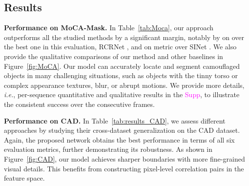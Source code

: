 \documentclass[10pt,twocolumn,letterpaper]{article}
\def\ie{\emph{i.e.}}
\newcommand{\supp}[1]{\textcolor{magenta}{#1}}
\def\figref#1{Figure~\ref{#1}}
\def\tabref#1{Table~\ref{#1}}
\begin{document}
\subsection{Results}
\textbf{Performance on MoCA-Mask.} 
In \tabref{tab:Moca}, our approach outperforms all the studied methods by a significant margin, notably by  on  over the best one in this evaluation, RCRNet \cite{yan2019semi}, and  on  metric over SINet \cite{fan2020Camouflage}. 
We also provide the qualitative comparisons of our method and other baselines in \figref{fig:MoCA}. Our model can accurately locate and segment camouflaged objects in many challenging situations, such as objects with the tinny torso or complex appearance textures, blur, or abrupt motions. We provide more details, \ie, per-sequence quantitative and qualitative results in the \supp{Supp}, to illustrate the consistent success over the consecutive frames.  


\textbf{Performance on CAD.} In \tabref{tab:results_CAD}, we assess different approaches by studying their cross-dataset generalization on the CAD dataset. Again, the proposed network obtains the best performance in terms of all six evaluation metrics, further demonstrating its robustness. As shown in \figref{fig:CAD}, our model achieves sharper boundaries with more fine-grained visual details. This benefits from constructing pixel-level correlation pairs in the feature space.
\end{document}
